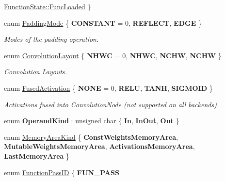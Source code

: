 \begin{DoxyCompactItemize}
\hyperlink{namespaceglow_a1c98da7214165b41c7d6b255503d4062ae25a0b7e15a925b8bf4d8016db8d27ac}{Function\+State\+::\+Func\+Loaded}
 \}
\item 
\mbox{\label{namespaceglow_a787f9659e35f7ac9a80cc9f3338fe7ea}} 
enum \hyperlink{namespaceglow_a787f9659e35f7ac9a80cc9f3338fe7ea}{Padding\+Mode} \{ {\bfseries C\+O\+N\+S\+T\+A\+NT} = 0, 
{\bfseries R\+E\+F\+L\+E\+CT}, 
{\bfseries E\+D\+GE}
 \}\begin{DoxyCompactList}\small\item\em Modes of the padding operation. \end{DoxyCompactList}
\item 
\mbox{\label{namespaceglow_aa2f3a33e05699df0f42295c5c4bd1f77}} 
enum \hyperlink{namespaceglow_aa2f3a33e05699df0f42295c5c4bd1f77}{Convolution\+Layout} \{ {\bfseries N\+H\+WC} = 0, 
{\bfseries N\+H\+WC}, 
{\bfseries N\+C\+HW}, 
{\bfseries N\+C\+HW}
 \}\begin{DoxyCompactList}\small\item\em Convolution Layouts. \end{DoxyCompactList}
\item 
\mbox{\label{namespaceglow_ae88f2cc9ccac93130ee1cc326d968a21}} 
enum \hyperlink{namespaceglow_ae88f2cc9ccac93130ee1cc326d968a21}{Fused\+Activation} \{ {\bfseries N\+O\+NE} = 0, 
{\bfseries R\+E\+LU}, 
{\bfseries T\+A\+NH}, 
{\bfseries S\+I\+G\+M\+O\+ID}
 \}\begin{DoxyCompactList}\small\item\em Activations fused into Convolution\+Node (not supported on all backends). \end{DoxyCompactList}
\item 
\mbox{\label{namespaceglow_ac310df6cfbec51a38b1cc46d1586eedc}} 
enum {\bfseries Operand\+Kind} \+: unsigned char \{ {\bfseries In}, 
{\bfseries In\+Out}, 
{\bfseries Out}
 \}
\item 
enum \hyperlink{namespaceglow_ab04a18d4367765236e5de54c47379e66}{Memory\+Area\+Kind} \{ {\bfseries Const\+Weights\+Memory\+Area}, 
{\bfseries Mutable\+Weights\+Memory\+Area}, 
{\bfseries Activations\+Memory\+Area}, 
{\bfseries Last\+Memory\+Area}
 \}
\item 
enum \hyperlink{namespaceglow_a3157945b92abd634c79fa9d4724472eb}{Function\+Pass\+ID} \{ {\bfseries F\+U\+N\+\_\+\+P\+A\+SS}

\end{DoxyCompactItemize}
